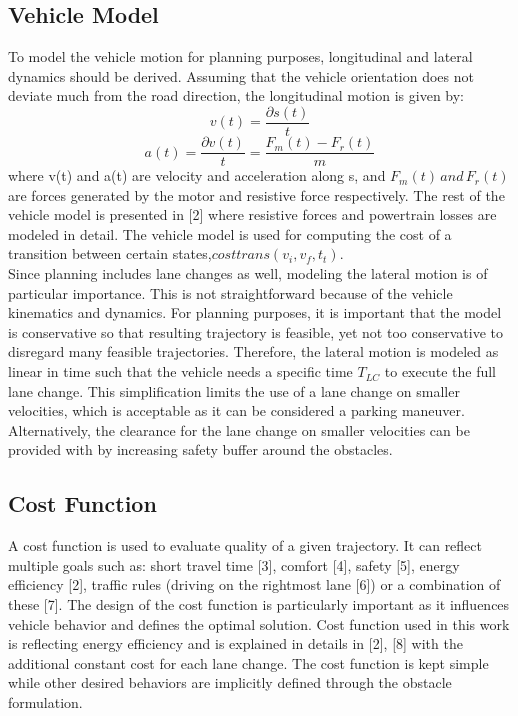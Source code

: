 \documentclass{thesisreport}
\begin{document}
 \subsection{Vehicle Model}
 To model the vehicle motion for planning purposes, longitudinal and lateral dynamics should be derived. Assuming
 that the vehicle orientation does not deviate much from the road direction, the longitudinal motion is given by:
 \begin{equation}
 v(t) = \frac{\partial s(t)}{t}
 \end{equation}
 \begin{equation}
  a(t) = \frac{\partial v(t)}{t} = \frac{F_m(t) - F_r(t)}{m}
 \end{equation}
 where v(t) and a(t) are velocity and acceleration along s, and $F_m(t) \,and\, F_r (t) $are forces generated by the motor and resistive force respectively. The rest of the vehicle model is presented in [2] where resistive forces and powertrain losses are modeled in detail. The vehicle model is used for computing the cost of a transition between certain states,$costtrans(v_i , v_f , t_t )$.\\
 \indent
 Since planning includes lane changes as well, modeling the lateral motion is of particular importance. This is not straightforward because of the vehicle kinematics and dynamics. For planning purposes, it is important that the model is conservative so that resulting trajectory is feasible, yet not too conservative to disregard many feasible trajectories. Therefore, the lateral motion is modeled as linear in time such that the vehicle needs a specific time $T _{LC}$ to execute the full lane change. This simplification limits the use of a lane change on smaller velocities, which is acceptable as it can be considered a parking maneuver. Alternatively, the clearance for the lane change on smaller velocities can be provided with by increasing safety buffer around the obstacles.
 \subsection{Cost Function}
 A cost function is used to evaluate quality of a given trajectory. It can reflect multiple goals such as: short travel time [3], comfort [4], safety [5], energy efficiency [2], traffic rules (driving on the rightmost lane [6]) or a combination of these [7]. The design of the cost function is particularly important as it influences vehicle behavior and defines the optimal solution. Cost function used in this work is reflecting energy efficiency and is explained in details in [2], [8] with the additional constant cost for each lane change. The cost function is kept simple while other desired behaviors are implicitly defined through the obstacle formulation.
\end{document}
